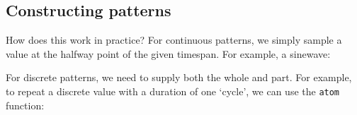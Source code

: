 \documentclass[
]{article}
\newenvironment{Shaded}{}{}
\newcommand{\DataTypeTok}[1]{\textcolor[rgb]{0.56,0.13,0.00}{#1}}
\newcommand{\DecValTok}[1]{\textcolor[rgb]{0.25,0.63,0.44}{#1}}
\newcommand{\FunctionTok}[1]{\textcolor[rgb]{0.02,0.16,0.49}{#1}}
\newcommand{\KeywordTok}[1]{\textcolor[rgb]{0.00,0.44,0.13}{\textbf{#1}}}
\newcommand{\NormalTok}[1]{#1}
\newcommand{\OperatorTok}[1]{\textcolor[rgb]{0.40,0.40,0.40}{#1}}
\newcommand{\OtherTok}[1]{\textcolor[rgb]{0.00,0.44,0.13}{#1}}
\begin{document}
\subsection{Constructing patterns}\label{constructing-patterns}

How does this work in practice? For continuous patterns, we simply
sample a value at the halfway point of the given timespan. For example,
a sinewave:

\begin{Shaded}
\end{Shaded}

For discrete patterns, we need to supply both the whole and part. For
example, to repeat a discrete value with a duration of one `cycle', we
can use the \texttt{atom} function:
\end{document}

